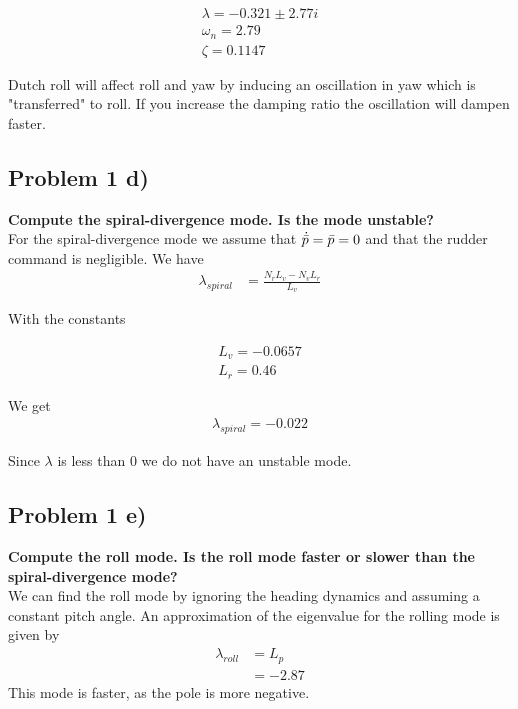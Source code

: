 \begin{align}
    \lambda = -0.321 \pm 2.77i \\
    \omega_n = 2.79 \\
    \zeta = 0.1147
\end{align}

Dutch roll will affect roll and yaw by inducing an oscillation in yaw which is "transferred" to roll. If you increase the damping ratio the oscillation will dampen faster. 


\subsection*{Problem 1 d)}

\textbf{Compute the spiral-divergence mode. Is the mode unstable?} \\
For the spiral-divergence mode we assume that $\dot{\bar{p}} = \Bar{p} = 0$ and that the rudder command is negligible. We have
\begin{align}
    \lambda_{spiral} &= \frac{N_rL_v - N_vL_r}{L_v} 
\end{align}

With the constants

\begin{align}
    L_v = -0.0657 \\
    L_r = 0.46
\end{align}

We get \\
\begin{align}
    \lambda_{spiral} = -0.022
\end{align}

Since $\lambda$ is less than 0 we do not have an unstable mode. 

\subsection*{Problem 1 e)}
\textbf{Compute the roll mode. Is the roll mode faster or slower than the spiral-divergence mode?} \\
We can find the roll mode by ignoring the heading dynamics and assuming a constant pitch angle. An approximation of the eigenvalue for the rolling mode is given by  
\begin{align}
    \lambda_{roll} &= L_p \\
    &= -2.87
\end{align}
This mode is faster, as the pole is more negative.


